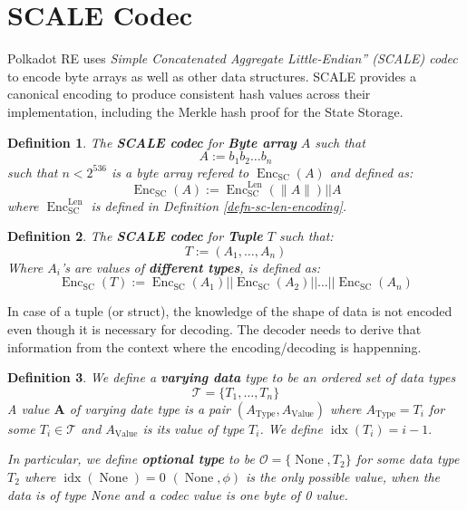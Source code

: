 \documentclass{book}
\newcommand{\assign}{:=}
\newcommand{\tmem}[1]{{\em #1\/}}
\newcommand{\tmmathbf}[1]{\ensuremath{\boldsymbol{#1}}}
\newcommand{\tmop}[1]{\ensuremath{\operatorname{#1}}}
\newcommand{\tmstrong}[1]{\textbf{#1}}
\newtheorem{definition}{Definition}
\newtheorem{definition}{Definition}
\begin{document}
\section{SCALE Codec}\label{sect-scale-codec}

Polkadot RE uses {\tmem{Simple Concatenated Aggregate Little-Endian'' (SCALE)
codec}} to encode byte arrays as well as other data structures. SCALE provides
a canonical encoding to produce consistent hash values across their
implementation, including the Merkle hash proof for the State Storage.

\begin{definition}
  \label{defn-scale-byte-array}The {\tmstrong{SCALE codec}} for
  {\tmstrong{Byte array}} $A$ such that
  \[ A \assign b_1 b_2 \ldots b_n \]
  such that $n < 2^{536}$ is a byte array refered to $\tmop{Enc}_{\tmop{SC}}
  (A)$ and defined as:
  \[ \tmop{Enc}_{\tmop{SC}} (A) \assign \tmop{Enc}^{\tmop{Len}}_{\tmop{SC}}
     (\| A \|) | | A \]
  where $\tmop{Enc}_{\tmop{SC}}^{\tmop{Len}}$ is defined in Definition
  \ref{defn-sc-len-encoding}. 
\end{definition}

\begin{definition}
  \label{defn-scale-tuple}The {\tmstrong{SCALE codec}} for {\tmstrong{Tuple}}
  $T$ such that:
  \[ T \assign (A_1, \ldots, A_n) \]
  Where $A_i$'s are values of {\tmstrong{different types}}, is defined as:
  \[ \tmop{Enc}_{\tmop{SC}} (T) \assign \tmop{Enc}_{\tmop{SC}} (A_1) | |
     \tmop{Enc}_{\tmop{SC}} (A_2) | | \ldots | | \tmop{Enc}_{\tmop{SC}} (A_n)
  \]
\end{definition}

In case of a tuple (or struct), the knowledge of the shape of data is not
encoded even though it is necessary for decoding. The decoder needs to derive
that information from the context where the encoding/decoding is happenning.

\begin{definition}
  \label{defn-varrying-data-type}We define a {\tmstrong{varying data}} type to
  be an ordered set of data types
  \[ \mathcal{T}= \{ T_1, \ldots, T_n \} \]
  A value $\tmmathbf{A}$ of varying date type is a pair $(A_{\tmop{Type}},
  A_{\tmop{Value}})$ where $A_{\tmop{Type}} = T_i$ for some $T_i \in
  \mathcal{T}$ and $A_{\tmop{Value}}$ is its value of type $T_i$. We define
  $\tmop{idx} (T_i) = i - 1.$
  
  In particular, we define {\tmstrong{optional type}} to be $\mathcal{O}= \{
  \tmop{None}, T_2 \}$ for some data type $T_2$ where $\tmop{idx}
  (\tmop{None}) = 0$ $(\tmop{None}, \phi)$ is the only possible value, when
  the data is of type None and a codec value is one byte of 0 value.
  
  
\end{definition}
\end{document}
